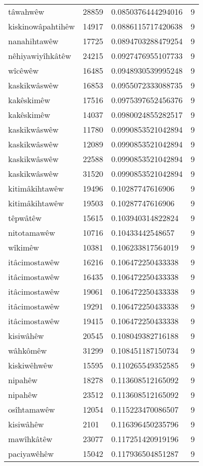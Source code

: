 \begin{longtable}{llll}
tâwahwêw & 28859 & 0.0850376444294016 & 9\\
kiskinowâpahtihêw & 14917 & 0.0886115717420638 & 9\\
nanahihtawêw & 17725 & 0.0894703288479254 & 9\\
nêhiyawiyîhkâtêw & 24215 & 0.0927476955107733 & 9\\
wîcêwêw & 16485 & 0.0948930539995248 & 9\\
kaskikwâswêw & 16853 & 0.0955072333088735 & 9\\
kakêskimêw & 17516 & 0.0975397652456376 & 9\\
kakêskimêw & 14037 & 0.0980024855282517 & 9\\
kaskikwâswêw & 11780 & 0.0990853521042894 & 9\\
kaskikwâswêw & 12089 & 0.0990853521042894 & 9\\
kaskikwâswêw & 22588 & 0.0990853521042894 & 9\\
kaskikwâswêw & 31520 & 0.0990853521042894 & 9\\
kitimâkihtawêw & 19496 & 0.10287747616906 & 9\\
kitimâkihtawêw & 19503 & 0.10287747616906 & 9\\
têpwâtêw & 15615 & 0.103940314822824 & 9\\
nitotamawêw & 10716 & 0.10433442548657 & 9\\
wîkimêw & 10381 & 0.106233817564019 & 9\\
itâcimostawêw & 16216 & 0.106472250433338 & 9\\
itâcimostawêw & 16435 & 0.106472250433338 & 9\\
itâcimostawêw & 19061 & 0.106472250433338 & 9\\
itâcimostawêw & 19291 & 0.106472250433338 & 9\\
itâcimostawêw & 19415 & 0.106472250433338 & 9\\
kisiwâhêw & 20545 & 0.108049382716188 & 9\\
wâhkômêw & 31299 & 0.108451187150734 & 9\\
kiskiwêhwêw & 15595 & 0.110265549352585 & 9\\
nipahêw & 18278 & 0.113608512165092 & 9\\
nipahêw & 23512 & 0.113608512165092 & 9\\
osîhtamawêw & 12054 & 0.115223470086507 & 9\\
kisiwâhêw & 2101 & 0.116396450235796 & 9\\
mawîhkâtêw & 23077 & 0.117251420919196 & 9\\
paciyawêhêw & 15042 & 0.117936504851287 & 9\\

\end{longtable}
